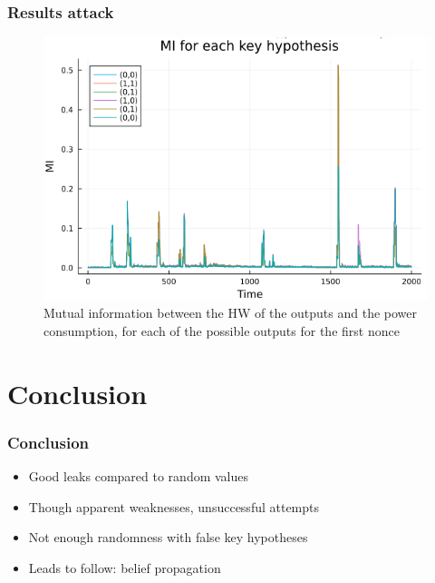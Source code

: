 \documentclass{beamer}
\begin{document}
	
	\begin{frame}
		\frametitle{Results attack}
		\begin{figure}[h]
			\centering
			\includegraphics[scale=0.3]{img_files/nonces_alea}
			\caption{Mutual information between the HW of the outputs and the power consumption, for each of the possible outputs for the first nonce}
			\label{all_alea}
		\end{figure}
	\end{frame}
	
	\section{Conclusion}
	\begin{frame}
		\frametitle{Conclusion}
		\begin{itemize}
			\item Good leaks compared to random values
			\item Though apparent weaknesses, unsuccessful attempts
			\item Not enough randomness with false key hypotheses
			\item Leads to follow: belief propagation
		\end{itemize}
	\end{frame}
	
\end{document}
